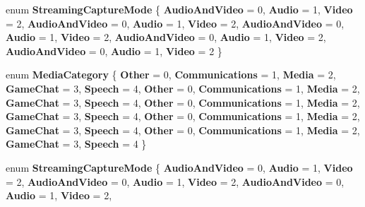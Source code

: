 \begin{DoxyCompactItemize}
enum {\bfseries Streaming\+Capture\+Mode} \{ \newline
{\bfseries Audio\+And\+Video} = 0, 
{\bfseries Audio} = 1, 
{\bfseries Video} = 2, 
{\bfseries Audio\+And\+Video} = 0, 
\newline
{\bfseries Audio} = 1, 
{\bfseries Video} = 2, 
{\bfseries Audio\+And\+Video} = 0, 
{\bfseries Audio} = 1, 
\newline
{\bfseries Video} = 2, 
{\bfseries Audio\+And\+Video} = 0, 
{\bfseries Audio} = 1, 
{\bfseries Video} = 2, 
\newline
{\bfseries Audio\+And\+Video} = 0, 
{\bfseries Audio} = 1, 
{\bfseries Video} = 2
 \}
\item 
\mbox{\label{namespace_windows_1_1_media_1_1_capture_a2061b374080798df6bea2b4f65634663}} 
enum {\bfseries Media\+Category} \{ \newline
{\bfseries Other} = 0, 
{\bfseries Communications} = 1, 
{\bfseries Media} = 2, 
{\bfseries Game\+Chat} = 3, 
\newline
{\bfseries Speech} = 4, 
{\bfseries Other} = 0, 
{\bfseries Communications} = 1, 
{\bfseries Media} = 2, 
\newline
{\bfseries Game\+Chat} = 3, 
{\bfseries Speech} = 4, 
{\bfseries Other} = 0, 
{\bfseries Communications} = 1, 
\newline
{\bfseries Media} = 2, 
{\bfseries Game\+Chat} = 3, 
{\bfseries Speech} = 4, 
{\bfseries Other} = 0, 
\newline
{\bfseries Communications} = 1, 
{\bfseries Media} = 2, 
{\bfseries Game\+Chat} = 3, 
{\bfseries Speech} = 4, 
\newline
{\bfseries Other} = 0, 
{\bfseries Communications} = 1, 
{\bfseries Media} = 2, 
{\bfseries Game\+Chat} = 3, 
\newline
{\bfseries Speech} = 4
 \}
\item 
\mbox{\label{namespace_windows_1_1_media_1_1_capture_a69a6672cfbdb543586234a95b0049c04}} 
enum {\bfseries Streaming\+Capture\+Mode} \{ \newline
{\bfseries Audio\+And\+Video} = 0, 
{\bfseries Audio} = 1, 
{\bfseries Video} = 2, 
{\bfseries Audio\+And\+Video} = 0, 
\newline
{\bfseries Audio} = 1, 
{\bfseries Video} = 2, 
{\bfseries Audio\+And\+Video} = 0, 
{\bfseries Audio} = 1, 
\newline
{\bfseries Video} = 2, 

\end{DoxyCompactItemize}
